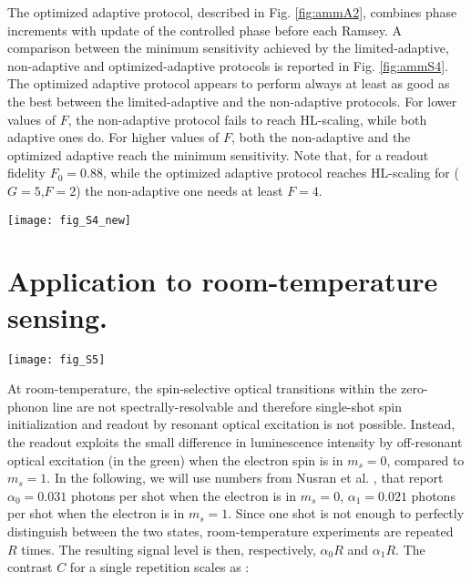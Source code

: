 The optimized adaptive protocol, described in Fig. \ref{fig:ammA2}, combines phase increments with update of the controlled phase before each Ramsey. A comparison between the minimum sensitivity achieved by the limited-adaptive, non-adaptive and optimized-adaptive protocols is reported in Fig. \ref{fig:ammS4}. The optimized adaptive protocol appears to perform always at least as good as the best between the limited-adaptive and the non-adaptive protocols. For lower values of $F$, the non-adaptive protocol fails to reach HL-scaling, while both adaptive ones do. For higher values of $F$, both the non-adaptive and the optimized adaptive reach the minimum sensitivity. Note that, for a readout fidelity $F_0 = 0.88$, while the optimized adaptive protocol reaches HL-scaling for ($G = 5$,$F = 2$) the non-adaptive one needs at least $F = 4$.


\begin{figure*}
	\centering
	\texttt{[image: fig\_S4\_new]}
	\caption{\label{fig:ammS4} \textbf{Comparing all protocols.} Simulations comparing the best achieved phase sensitivities for different protocols ($G = 5$ left and central plots, $G = 3$ for the plot on the right). We assume $T_2^* = 96\mu$s. The optimized adaptive protocol performs always at least as well as the non-adaptive protocol. For a fixed value of $G$, the optimized adaptive protocol reaches the best sensitivity for a smaller value of $F$.
	}
\end{figure*}
\section{Application to room-temperature sensing.}
\label{sec:ammSIRTsens}
\begin{figure*}
	\centering
	\texttt{[image: fig\_S5]}
	\caption{\label{fig:ammS5} \textbf{Contrast for room-temperature readout} Effective readout fidelity as a function of readout repetitions, for measurements at room-temperature (no single-shot readout).
	}
\end{figure*}

At room-temperature, the spin-selective optical transitions within the zero-phonon line are not spectrally-resolvable and therefore single-shot spin initialization and readout by resonant optical excitation is not possible. Instead, the readout exploits the small difference in luminescence intensity by off-resonant optical excitation (in the green) when the electron spin is in $m_s = 0$, compared to $m_s = 1$. In the following, we will use numbers from Nusran et al. \cite{Nusran_NatNano_2012}, that report $\alpha_0 = 0.031$ photons per shot when the electron is in $m_s = 0$, $\alpha_1 = 0.021$ photons per shot when the electron is in $m_s = 1$.  Since one shot is not enough to perfectly distinguish between the two states, room-temperature experiments are repeated $R$ times. The resulting signal level is then, respectively, $\alpha_0 R$ and $\alpha_1 R$. The contrast $C$ for a single repetition scales as \cite{Taylor_NatPhys_2008}:

